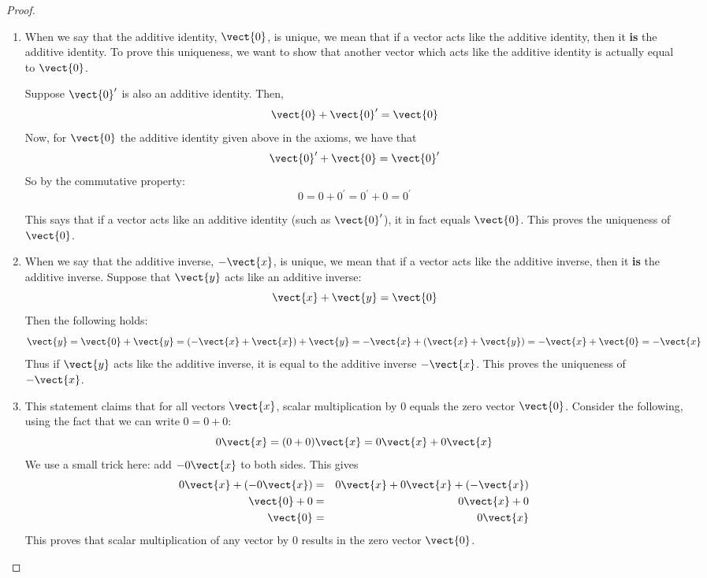\begin{proof}
\begin{enumerate}
\item
When we say that the additive identity, $\vect{0}$, is unique, we mean that if a vector acts like the additive identity, then it \textbf{is} the additive identity. To prove this uniqueness, we want to show that another vector which acts like the additive identity is actually equal to $\vect{0}$. 

Suppose $\vect{0}^{\prime }$ is also an additive identity. Then,
\[
\vect{0} + \vect{0}^{\prime} = \vect{0}
\]
Now, for $\vect{0}$ the additive identity given above in the axioms, we have that 
\[
\vect{0}^{\prime} + \vect{0} = \vect{0}^{\prime}
\]
So by the commutative property:
\[
0 = 0 + 0^{\prime} = 0^{\prime} + 0 = 0^{\prime}
\]

This says that if a vector acts like an additive identity (such as $\vect{0}^{\prime}$), it in fact equals $\vect{0}$. This proves the uniqueness of $\vect{0}$.

\item
When we say that the additive inverse, $-\vect{x}$, is unique, we mean that if a vector acts like the additive inverse, then it \textbf{is} the additive inverse. 
Suppose that $\vect{y}$ acts like an additive inverse: 
\begin{equation*}
\vect{x}+\vect{y}=\vect{0}
\end{equation*}
Then the following holds:
\[
\vect{y} = \vect{0} + \vect{y} = (-\vect{x} + \vect{x}) + \vect{y} = -\vect{x} + (\vect{x} + \vect{y}) = -\vect{x} + \vect{0} = -\vect{x}
\]
Thus if $\vect{y}$ acts like the additive inverse, it is equal to the additive
inverse $-\vect{x}$. This proves the uniqueness of $-\vect{x}$. 

\item
This statement claims that for all vectors $\vect{x}$, scalar multiplication by $0$ equals the zero vector $\vect{0}$. Consider the following, using the fact that we can write $0=0+0$:
\begin{equation*}
0\vect{x}=(0+0) \vect{x}=0\vect{x}+0\vect{x}
\end{equation*}
We use a small trick here: add $-0\vect{x}$ to both sides. This gives 
\begin{eqnarray*}
0\vect{x} + (-0\vect{x})&=&0\vect{x}+0\vect{x}+(-\vect{x})\\
\vect{0} + 0 &=&0\vect{x} + 0 \\
\vect{0} &=& 0\vect{x}
\end{eqnarray*}
This proves that scalar multiplication of any vector by $0$ results in the zero vector $\vect{0}$. 


\end{enumerate}
\end{proof}
